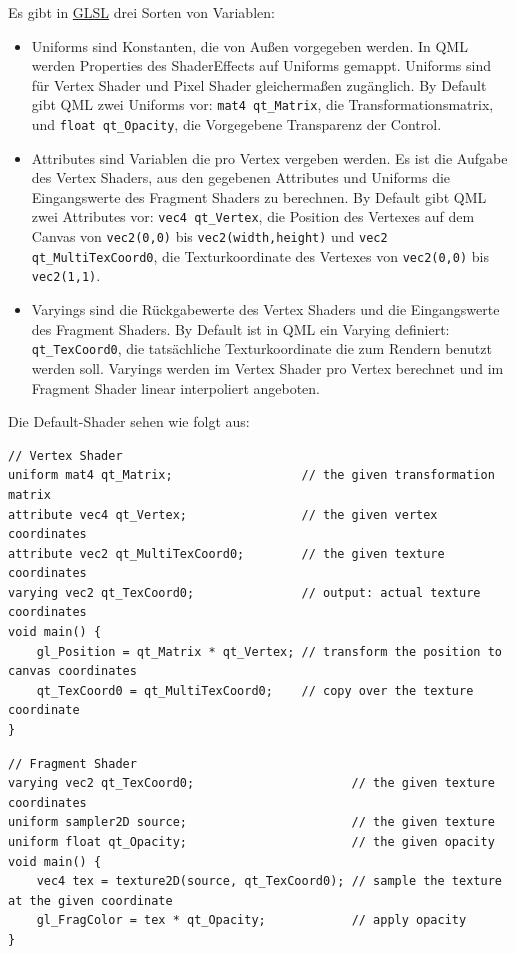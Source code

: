 \documentclass[a4paper]{article}
\begin{document}
Es gibt in \href{https://www.opengl.org/sdk/docs/}{GLSL} drei Sorten von Variablen:
\begin{itemize}
\item Uniforms sind Konstanten, die von Außen vorgegeben werden. In QML werden Properties des ShaderEffects auf Uniforms gemappt. Uniforms sind für Vertex Shader und Pixel Shader gleichermaßen zugänglich. By Default gibt QML zwei Uniforms vor: \verb~mat4 qt_Matrix~, die Transformationsmatrix, und \verb~float qt_Opacity~, die Vorgegebene Transparenz der Control.
\item Attributes sind Variablen die pro Vertex vergeben werden. Es ist die Aufgabe des Vertex Shaders, aus den gegebenen Attributes und Uniforms die Eingangswerte des Fragment Shaders zu berechnen. By Default gibt QML zwei Attributes vor: \verb~vec4 qt_Vertex~, die Position des Vertexes auf dem Canvas von \verb~vec2(0,0)~ bis \verb~vec2(width,height)~ und \verb~vec2 qt_MultiTexCoord0~, die Texturkoordinate des Vertexes von \verb~vec2(0,0)~ bis \verb~vec2(1,1)~.
\item Varyings sind die Rückgabewerte des Vertex Shaders und die Eingangswerte des Fragment Shaders. By Default ist in QML ein Varying definiert: \verb~qt_TexCoord0~, die tatsächliche Texturkoordinate die zum Rendern benutzt werden soll. Varyings werden im Vertex Shader pro Vertex berechnet und im Fragment Shader linear interpoliert angeboten.
\end{itemize}

Die Default-Shader sehen wie folgt aus:

\begin{verbatim}
// Vertex Shader
uniform mat4 qt_Matrix;                  // the given transformation matrix
attribute vec4 qt_Vertex;                // the given vertex coordinates
attribute vec2 qt_MultiTexCoord0;        // the given texture coordinates
varying vec2 qt_TexCoord0;               // output: actual texture coordinates
void main() {
    gl_Position = qt_Matrix * qt_Vertex; // transform the position to canvas coordinates
    qt_TexCoord0 = qt_MultiTexCoord0;    // copy over the texture coordinate
}
\end{verbatim}

\begin{verbatim}
// Fragment Shader
varying vec2 qt_TexCoord0;                      // the given texture coordinates
uniform sampler2D source;                       // the given texture
uniform float qt_Opacity;                       // the given opacity
void main() {
    vec4 tex = texture2D(source, qt_TexCoord0); // sample the texture at the given coordinate
    gl_FragColor = tex * qt_Opacity;            // apply opacity
}
\end{verbatim}
\end{document}
